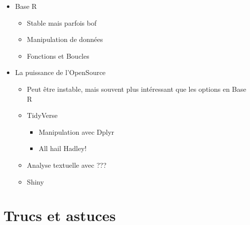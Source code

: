 \documentclass[
  letterpaper,
]{scrbook}
\providecommand{\tightlist}{%
  \setlength{\itemsep}{0pt}\setlength{\parskip}{0pt}}\usepackage{longtable,booktabs,array}
\begin{document}
\begin{itemize}
\tightlist
\item
  Base R

  \begin{itemize}
  \tightlist
  \item
    Stable mais parfois bof
  \item
    Manipulation de données
  \item
    Fonctions et Boucles
  \end{itemize}
\item
  La puissance de l'OpenSource

  \begin{itemize}
  \tightlist
  \item
    Peut être instable, mais souvent plus intéressant que les options en
    Base R
  \item
    TidyVerse

    \begin{itemize}
    \tightlist
    \item
      Manipulation avec Dplyr
    \item
      All hail Hadley!
    \end{itemize}
  \item
    Analyse textuelle avec ???
  \item
    Shiny
  \end{itemize}
\end{itemize}

\hypertarget{trucs-et-astuces}{%
\section{Trucs et astuces}\label{trucs-et-astuces}}
\end{document}
